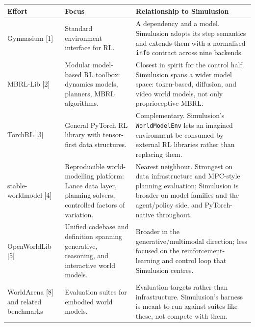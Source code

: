 \documentclass[10pt,a4paper]{article}
\begin{document}
{\footnotesize
\begin{tabular}{@{}p{}p{}p{}@{}}
\toprule
\textbf{Effort} & \textbf{Focus} & \textbf{Relationship to Simulusion}\\
\midrule
Gymnasium [1] & Standard environment interface for RL. & A dependency and a model. Simulusion adopts its step semantics and extends them with a normalised \texttt{info} contract across nine backends.\\[1.4mm]
MBRL-Lib [2] & Modular model-based RL toolbox: dynamics models, planners, MBRL algorithms. & Closest in spirit for the control half. Simulusion spans a wider model space: token-based, diffusion, and video world models, not only proprioceptive MBRL.\\[1.4mm]
TorchRL [3] & General PyTorch RL library with tensor-first data structures. & Complementary. Simulusion's \texttt{WorldModelEnv} lets an imagined environment be consumed by external RL libraries rather than replacing them.\\[1.4mm]
stable-worldmodel [4] & Reproducible world-modelling platform: Lance data layer, planning solvers, controlled factors of variation. & Nearest neighbour. Strongest on data infrastructure and MPC-style planning evaluation; Simulusion is broader on model families and the agent/policy side, and PyTorch-native throughout.\\[1.4mm]
OpenWorldLib [5] & Unified codebase and definition spanning generative, reasoning, and interactive world models. & Broader in the generative/multimodal direction; less focused on the reinforcement-learning and control loop that Simulusion centres.\\[1.4mm]
WorldArena [8] and related benchmarks & Evaluation suites for embodied world models. & Evaluation targets rather than infrastructure. Simulusion's harness is meant to run against suites like these, not compete with them.\\
\bottomrule
\end{tabular}}
\end{document}
